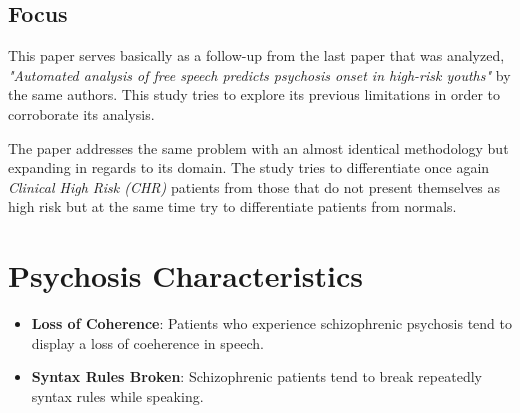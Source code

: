\documentclass{Paper_Summary}
\begin{document}
\makepapertitle

\breakline

\begin{center}
    \section*{Focus}
\end{center}

    This paper serves basically as a follow-up from the last paper that was analyzed, \emph{"Automated analysis of free speech predicts psychosis onset in high-risk youths"} by the same authors. This study tries to explore its previous limitations in order to corroborate its analysis.

    The paper addresses the same problem with an almost identical methodology but expanding in regards to its domain. The study tries to differentiate once again \emph{Clinical High Risk (CHR)} patients from those that do not present themselves as high risk but at the same time try to differentiate patients from normals.

\breakline

\newpage

\section{Psychosis Characteristics}
    \begin{itemize}
        \item \textbf{Loss of Coherence}: Patients who experience schizophrenic psychosis tend to display a loss of coeherence in speech.
        \item \textbf{Syntax Rules Broken}: Schizophrenic patients tend to break repeatedly syntax rules while speaking.
    \end{itemize}
\end{document}
